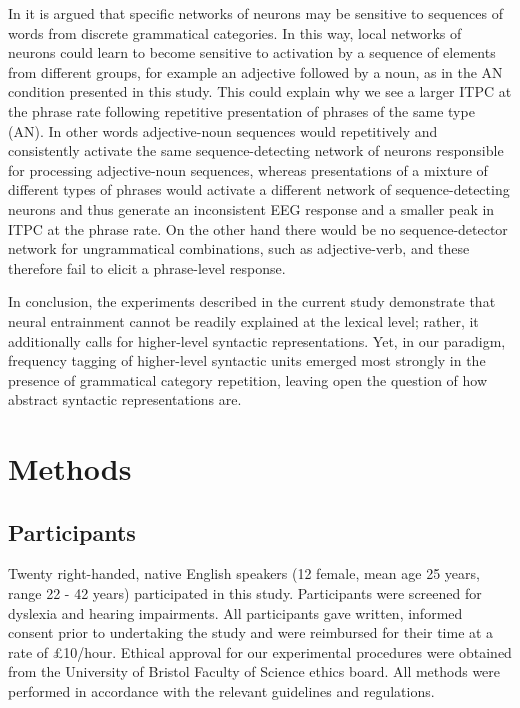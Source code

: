 \documentclass[10pt,letterpaper]{article}
\newcommand{\citet}[1]{\cite{#1}}
\begin{document}
In \citet{PulvermullerEtAl2002} it is argued that specific networks of
neurons may be sensitive to sequences of words from discrete
grammatical categories. In this way, local networks of neurons could
learn to become sensitive to activation by a sequence of elements from
different groups, for example an adjective followed by a noun, as in
the AN condition presented in this study. This could explain why we
see a larger ITPC at the phrase rate following repetitive presentation
of phrases of the same type (AN). In other words adjective-noun
sequences would repetitively and consistently activate the same
sequence-detecting network of neurons responsible for processing
adjective-noun sequences, whereas presentations of a mixture of
different types of phrases would activate a different network of
sequence-detecting neurons and thus generate an inconsistent EEG
response and a smaller peak in ITPC at the phrase rate. On the other
hand there would be no sequence-detector network for ungrammatical
combinations, such as adjective-verb, and these therefore fail to
elicit a phrase-level response.

In conclusion, the experiments described in the current study
demonstrate that neural entrainment cannot be readily explained at the
lexical level; rather, it additionally calls for higher-level
syntactic representations. Yet, in our paradigm, frequency tagging of
higher-level syntactic units emerged most strongly in the presence of
grammatical category repetition, leaving open the question of how
abstract syntactic representations are.

\section*{Methods}
\subsection*{Participants}

Twenty right-handed, native English speakers (12 female, mean age 25
years, range 22 - 42 years) participated in this study. Participants
were screened for dyslexia and hearing impairments. All participants
gave written, informed consent prior to undertaking the study and were
reimbursed for their time at a rate of £10/hour. Ethical approval for
our experimental procedures were obtained from the University of
Bristol Faculty of Science ethics board. All methods were performed in
accordance with the relevant guidelines and regulations.
\end{document}
